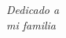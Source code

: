 \chapter*{}
\thispagestyle{empty} %
\begin{flushright}
	\textit{Dedicado a \\
		mi familia}
\end{flushright}
